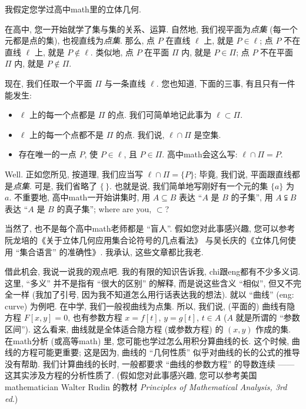 \begin{example}
    我假定您学过高中\gls{math}里的立体几何.

    在高中, 您一开始就学了集与集的关系、运算.
    自然地, 我们视平面为\emph{点集} (每一个元都是点的集),
    也视直线为\emph{点集}.
    那么, 点 $P$ 在直线 $\ell$ 上, 就是 $P \in \ell$;
    点 $P$ 不在直线 $\ell$ 上, 就是 $P \notin \ell$.
    类似地, 点 $P$ 在平面 $\Pi$ 内, 就是 $P \in \Pi$;
    点 $P$ 不在平面 $\Pi$ 内, 就是 $P \notin \Pi$.

    现在, 我们任取一个平面 $\Pi$ 与一条直线 $\ell$.
    您也知道, 下面的三事, 有且只有一件能发生:
    \begin{itemize}
        \item $\ell$ 上的每一个点都是 $\Pi$ 的点.
              我们可简单地记此事为 $\ell \subset \Pi$.
        \item $\ell$ 上的每一个点都不是 $\Pi$ 的点.
              我们说, $\ell \cap \Pi$ 是空集.
        \item 存在唯一的一点 $P$,
              使 $P \in \ell$, 且 $P \in \Pi$.
              高中\gls{math}会这么写: $\ell \cap \Pi = P$.
    \end{itemize}
    Well.
    正如您所见, 按道理, 我们应当写 $\ell \cap \Pi = \{ P \}$;
    毕竟, 我们说, 平面跟直线都是\emph{点集}.
    可是, 我们省略了 $\{ \, \}$.
    也就是说, 我们简单地写刚好有一个元的集 $\{ a \}$ 为 $a$.
    不重要地, 高中\gls{math}一开始讲集时,
    用 $A \subseteq B$ 表达 ``$A$ 是 $B$ 的子集'',
    用 $A \subsetneqq B$ 表达 ``$A$ 是 $B$ 的真子集'';
    where are you, $\subset$?

    当然了, 也不是每个高中\gls{math}老师都是 ``盲人''.
    假如您对此事感兴趣,
    您可以参考阮龙培的《关于立体几何应用集合论符号的几点看法》%
    与吴长庆的《立体几何使用 ``集合语言'' 的准确性》.
    我承认, 这些文章都比我老.
\end{example}

借此机会, 我说一说我的观点吧.
我的有限的知识告诉我, \gls{chi}跟\gls{eng}都有不少多义词.
这里, ``多义'' 并不是指有 ``很大的区别'' 的解释,
而是说这些含义 ``相似'', 但又不完全一样
(我加了引号, 因为我不知道怎么用行话表达我的想法).
就以 ``曲线'' (\gls{eng}: curve) 为例吧.
在中学, 我们一般视曲线为点集.
所以, 我们说, (平面的) 曲线有隐方程 $F[x, y] = 0$,
也有参数方程 $x = f[t]$, $y = g[t]$, $t \in A$
($A$ 就是所谓的 ``参数区间'').
这么看来,
曲线就是全体适合隐方程 (或参数方程) 的 $(x, y)$ 作成的集.
在\gls{math}分析 (或高等\gls{math}) 里,
您可能也学过怎么用积分算曲线的长.
这个时候, 曲线的方程可能更重要;
这是因为,
曲线的 ``几何性质'' 似乎对曲线的长的公式的推导没有帮助.
我们计算曲线的长时, 一般都要求 ``曲线的参数方程'' 的导数连续%
——这其实涉及方程的分析性质了.
(假如您对此事感兴趣,
您可以参考美国\gls{mathematician} Walter Rudin 的教材
\textit{Principles of Mathematical Analysis, 3rd ed}.)

